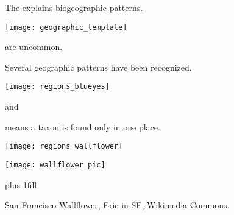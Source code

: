 \documentclass[t]{beamer}
\begin{document}

\begin{frame}[t,plain]{Our goal for today is to }

	\hangpara interpret and explain in terms of dispersal and vicariance.}
	
\end{frame}

\begin{frame}[t,plain]{The  explains biogeographic patterns.}
	\begin{center}
		\texttt{[image: geographic\_template]}
	\end{center}
\end{frame}



{
\begin{frame}[b,plain]{ are uncommon.}

\end{frame}
}




\begin{frame}[t,plain]{Several geographic patterns have been recognized.}
\begin{multicols}{2}

	\noindent\texttt{[image: regions\_blueyes]}

	\columnbreak
	
	\hangpara{}
	
	\hangpara{}
	
	\hangpara{} and

	\hangpara{}

\end{multicols}
\end{frame}

\begin{frame}[t,plain]{ means a taxon is found only in one place.}
\begin{multicols}{2}

	\texttt{[image: regions\_wallflower]}

	\columnbreak
	
	\hfil\texttt{[image: wallflower\_pic]}\hfill

	\vfill
		
\end{multicols}

	\vskip0pt plus 1fill
	
	\tiny\hfill San Francisco Wallflower, Eric in SF, Wikimedia Commons.

\end{frame}
\end{document}

